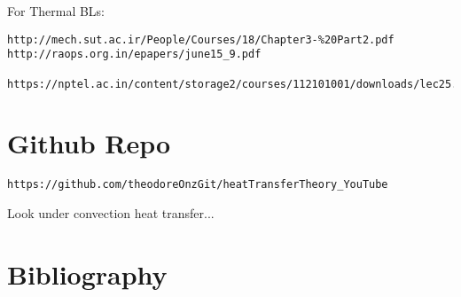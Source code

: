 \documentclass[11pt]{article}
\begin{document}
For Thermal BLs:

\begin{verbatim}
http://mech.sut.ac.ir/People/Courses/18/Chapter3-%20Part2.pdf
http://raops.org.in/epapers/june15_9.pdf

https://nptel.ac.in/content/storage2/courses/112101001/downloads/lec25.pdf
\end{verbatim}

\part{Github Repo}
\begin{verbatim}
https://github.com/theodoreOnzGit/heatTransferTheory_YouTube
\end{verbatim}

Look under convection heat transfer...


\part{Bibliography}

\printbibliography
\end{document}
